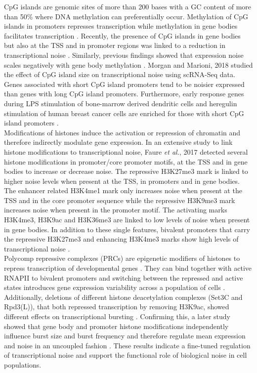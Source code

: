 CpG islands are genomic sites of more than 200 bases with a GC content of more than 50\% where DNA methylation can preferentially occur. Methylation of CpG islands in promoters represses transcription while methylation in gene bodies facilitates transcription \citep{Portela2010}.  Recently, the presence of CpG islands in gene bodies but also at the TSS and in promoter regions was linked to a reduction in transcriptional noise \citep{Faure2017}. Similarly, previous findings showed that expression noise scales negatively with gene body methylation \cite{Huh2013}. Morgan and Marioni, 2018 studied the effect of CpG island size on transcriptional noise using scRNA-Seq data. Genes associated with short CpG island promoters tend to be noisier expressed than genes with long CpG island promoters. Furthermore, early response genes during \gls{LPS} stimulation of bone-marrow derived dendritic cells and heregulin stimulation of human breast cancer cells are enriched for those with short CpG island promoters \citep{Morgan2018}. \\

Modifications of histones induce the activation or repression of chromatin and  therefore indirectly modulate gene expression\citep{Suganuma2011}. In an extensive study to link histone modifications to transcriptional noise, Faure \textit{et al.}, 2017 detected several histone modifications in promoter/core promoter motifs, at the TSS and in gene bodies to increase or decrease noise. The repressive \gls{H3K27me3} mark is linked to higher noise levels when present at the TSS, in promoters and in gene bodies. The enhancer related \gls{H3K4me1} mark only increases noise when present at the TSS and in the core promoter sequence while the repressive \gls{H3K9me3} mark increases noise when present in the promoter motif. The activating marks \Gls{H3K4me3}, \gls{H3K9ac} and \gls{H3K36me3} are linked to low levels of noise when present in gene bodies. In addition to these single features, bivalent promoters that carry the repressive \gls{H3K27me3} and enhancing \gls{H3K4me3} marks show high levels of transcriptional noise \citep{Faure2017}.\\ 

Polycomp repressive complexes (PRCs) are epigenetic modifiers of histones to repress transcription of developmental genes \citep{Chittock2017}. They can bind together with active \gls{RNAPII} to bivalent promoters and switching between the repressed and active states introduces gene expression variability across a population of cells \cite{Kar2017}. Additionally, deletions of different histone deacetylation complexes (Set3C and Rpd3(L)), that both repressed transcription by removing H3K9ac, showed different effects on transcriptional bursting \citep{Weinberger2012}.  Confirming this, a later study showed that gene body and promoter histone modifications independently influence burst size and burst frequency and therefore regulate mean expression and noise in an uncoupled fashion \cite{Wu2017}. These results indicate a fine-tuned regulation of transcriptional noise and support the functional role of biological noise in cell populations.\\

